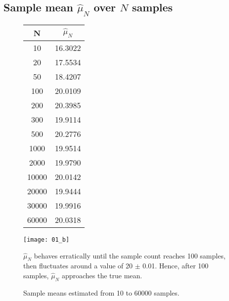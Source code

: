 \documentclass[12pt, a4paper, titlepage, fleqn]{article}
\begin{document}
\subsection{Sample mean $\hat{\mu}_N$ over $N$ samples}
\begin{figure}[h!]
	\begin{minipage}{0.25\textwidth}
		\begin{tabular}{| c | c |}
			\hline
			N & $\hat{\mu}_N$ \\
			\hline
			10 & 16.3022 \\
			20 & 17.5534 \\
			50 & 18.4207 \\
			100 & 20.0109 \\
			200 & 20.3985 \\
			300 & 19.9114 \\
			500 & 20.2776 \\
			1000 & 19.9514 \\
			2000 & 19.9790 \\
			10000 & 20.0142 \\
			20000 &	19.9444 \\
			30000 &	19.9916 \\
			60000 &	20.0318 \\
			\hline
		\end{tabular}
	\end{minipage}
	\begin{minipage}{0.7\textwidth}
		\texttt{[image: 01\_b]}
	\end{minipage}
	\caption{Sample means estimated from 10 to 60000 samples.}
	\label{fig:sample mean}
	\parskip 2pt
	$\hat{\mu}_N$ behaves erratically until the sample count reaches 100 samples, then fluctuates around a value of 20 $\pm$ 0.01. Hence, after 100 samples, $\hat{\mu}_N$ approaches the true mean.
\end{figure}

\pagebreak
\end{document}
